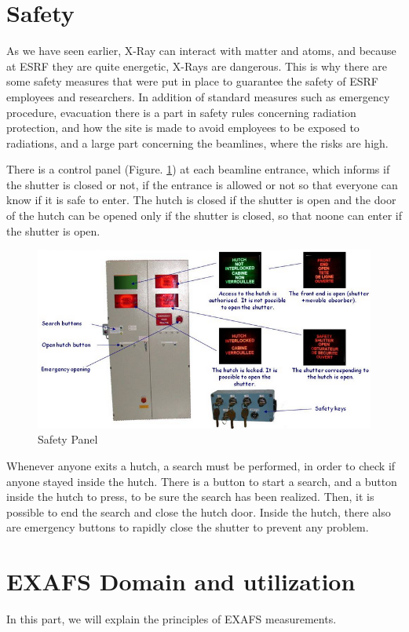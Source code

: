 \documentclass[11pt,a4paper,oneside]{report}
\begin{document}
\section{Safety}\label{Safety}
As we have seen earlier, X-Ray can interact with matter and atoms, and because at ESRF they are quite energetic, X-Rays are dangerous. This is why there are some safety measures that were put in place to guarantee the safety of ESRF employees and researchers. In addition of standard measures such as emergency procedure, evacuation there is a part in safety rules concerning radiation protection, and how the site is made to avoid employees to be exposed to radiations, and a large part concerning the beamlines, where the risks are high.

There is a control panel (Figure. \ref{SafetyPanel}) at each beamline entrance, which informs if the shutter is closed or not, if the entrance is allowed or not so that everyone can know if it is safe to enter. The hutch is closed if the shutter is open and the door of the hutch can be opened only if the shutter is closed, so that noone can enter if the shutter is open.

\begin{figure}[H]
\centering
    \includegraphics[width=350pt]{Images/SafetyPanel.png}
    \caption{Safety Panel\cite{Safety}}
    \label{SafetyPanel}    
\end{figure}

Whenever anyone exits a hutch, a search must be performed, in order to check if anyone stayed inside the hutch. There is a button to start a search, and a button inside the hutch to press, to be sure the search has been realized. Then, it is possible to end the search and close the hutch door. Inside the hutch, there also are emergency buttons to rapidly close the shutter to prevent any problem.


\section{EXAFS Domain and utilization}
In this part, we will explain the principles of EXAFS measurements.
\end{document}
